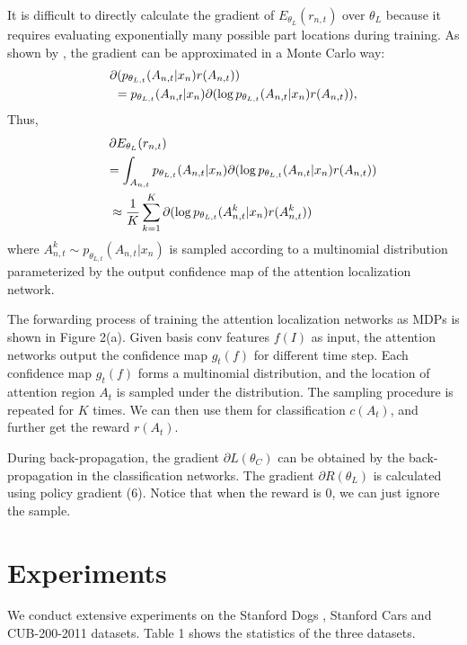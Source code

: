 \documentclass[runningheads]{llncs}
\begin{document}
It is difficult to directly calculate the gradient of $E_{\theta_L}(r_{n,t})$ over $\theta_L$ because it requires evaluating exponentially many possible part locations during training.
As shown by \cite{bd20}, the gradient can be approximated in a Monte Carlo way:
\begin{eqnarray}
\partial (p_{\theta_{L,t}}(A_{n,t}|x_n)r(A_{n,t})) \hspace{1.3in}\\
= p_{\theta_{L,t}}(A_{n,t}|x_n) \partial (\log p_{\theta_{L,t}}(A_{n,t}|x_n)r(A_{n,t})) , \nonumber
\end{eqnarray}
Thus,
\begin{eqnarray}
\partial E_{\theta_L}(r_{n,t}) \hspace{2.1in}\\
 = \int_{A_{n,t}} p_{\theta_{L,t}}(A_{n,t}|x_n) \partial (\log p_{\theta_{L,t}}(A_{n,t}|x_n)r(A_{n,t})) \hspace{-0.215in} \nonumber\\
 \approx \frac{1}{K} \sum_{k=1}^K \partial(\log p_{\theta_{L,t}}(A_{n,t}^k|x_n)r(A_{n,t}^k)) \hspace{0.5in} \nonumber
\end{eqnarray}
where $A_{n,t}^k\sim p_{\theta_{L,t}}(A_{n,t}|x_n) $ is sampled according to a multinomial distribution parameterized by the output confidence map of the attention localization network.

The forwarding process of training the attention localization networks as MDPs is shown in Figure 2(a). Given basis conv features $f(I)$ as input, the attention networks output the confidence map $g_t(f)$ for different time step. Each confidence map $g_t(f)$ forms a multinomial distribution, and the location of attention region $A_t$ is sampled under the distribution. The sampling procedure is repeated for $K$ times. We can then use them for classification $c(A_t)$, and further get the reward $r(A_t)$.

During back-propagation, the gradient $\partial L(\theta_C)$ can be  obtained by the back-propagation in the classification networks.
The gradient $\partial R(\theta_L)$ is calculated using policy gradient (6).
Notice that when the reward is 0, we can just ignore the sample.

\section{Experiments}
We conduct extensive experiments on the Stanford Dogs \cite{bd4}, Stanford Cars \cite{bd5} and CUB-200-2011 \cite{bd6} datasets.
Table 1 shows the statistics of the three datasets.
\end{document}
